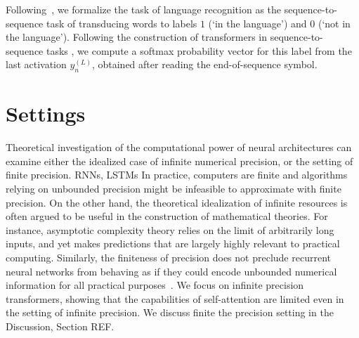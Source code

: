 \documentclass[11pt,a4paper]{article}
\begin{document}
Following~\citet{weiss2018practical}, we formalize the task of language recognition as the sequence-to-sequence task of transducing words to labels $1$ (`in the language') and $0$ (`not in the language').
Following the construction of transformers in sequence-to-sequence tasks \cite{vaswani2017attention}, we compute a softmax probability vector for this label from the last activation $y_{n}^{(L)}$, obtained after reading the end-of-sequence symbol.







\section{Settings}

Theoretical investigation of the computational power of neural architectures can examine either the idealized case of infinite numerical precision, or the setting of finite precision.
RNNs, LSTMs
In practice, computers are finite and algorithms relying on unbounded precision might be infeasible to approximate with finite precision.
On the other hand, the theoretical idealization of infinite resources is often argued to be useful in the construction of mathematical theories.
For instance, asymptotic complexity theory relies on the limit of arbitrarily long inputs, and yet makes predictions that are largely highly relevant to practical computing.
Similarly, the finiteness of precision does not preclude recurrent neural networks  from behaving as if they could encode unbounded numerical information for all practical purposes~\cite{weiss2018practical}.
We focus on infinite precision transformers, showing that the capabilities of self-attention are limited even in the setting of infinite precision.
We discuss finite the precision setting in the Discussion, Section REF.
\end{document}
